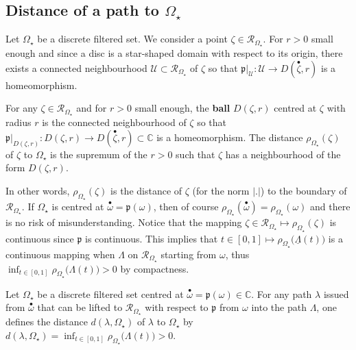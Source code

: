 \documentclass[11pt, english]{smfart}
\theoremstyle{definition}
\begin{document}
\subsection{Distance of a path to $\Omega_\star$}

Let  $\Omega_\star$ be a discrete filtered set.
We consider a point $\zeta \in
\mathscr{R}_{\Omega_\star}$. For $r>0$ small enough and 
since a disc is a star-shaped domain with
respect to its origin, there exists a connected neighbourhood  
$\mathscr{U} \subset \mathscr{R}_{\Omega_\star}$  of
$\zeta$ so that
$\mathfrak{p}|_{\mathscr{U}} : \mathscr{U} \to D({ {\stackrel{\bullet}{\zeta}} },r)$
is a homeomorphism.

\begin{defi}
For any $\zeta \in \mathscr{R}_{\Omega_\star}$ and for $r>0$ small
enough, the \textbf{ball}  $D(\zeta,r)$ centred at
$\zeta$ with radius $r$ is the connected neighbourhood of
$\zeta$ so that 
$\mathfrak{p}|_{D(\zeta,r)} : D(\zeta,r) \to D({ {\stackrel{\bullet}{\zeta}} },r) \subset \mathbb{C}$
is a homeomorphism. 
The distance $\rho_{\Omega_\star}(\zeta)$ of $\zeta$ to $\Omega_\star$
is  the supremum of the $r>0$
such that $\zeta$ has a neighbourhood of the form $D(\zeta,r)$. 
\end{defi}

In other words, $\rho_{\Omega_\star}(\zeta)$ is the distance of
$\zeta$ (for the norm $|.|$) to the boundary of $\mathscr{R}_{\Omega_\star}$. 
If $\Omega_\star$ is centred at ${ {\stackrel{\bullet}{\omega}} } = \mathfrak{p}(\omega)$,
then of course $\rho_{\Omega_\star}({ {\stackrel{\bullet}{\omega}} }) =
\rho_{\Omega_\star}(\omega)$ and there is no risk of
misunderstanding. Notice that the mapping $\zeta \in
\mathscr{R}_{\Omega_\star} \mapsto \rho_{\Omega_\star}(\zeta)$ is
continuous since $\mathfrak{p}$ is continuous. This implies that 
$t \in [0,1] \mapsto
\rho_{\Omega_\star}\big(\underline{\Lambda}(t)\big)$ is a continuous
mapping when $\Lambda$ on
$\mathscr{R}_{\Omega_\star}$ starting from $\omega$, thus 
$\inf_{t \in [0,1]} \rho_{\Omega_\star}\big( \Lambda(t)\big) >0$ by compactness.

\begin{defi}\label{dpathomega}
Let  $\Omega_\star$ be a discrete filtered set centred
at ${{ {\stackrel{\bullet}{\omega}} } = \mathfrak{p}(\omega) \in \mathbb{C}}$.
For any path $\lambda$ issued from ${ {\stackrel{\bullet}{\omega}} }$ that can be lifted to 
$\mathscr{R}_{\Omega_\star}$ with respect to $\mathfrak{p}$ from
$\omega$ into the path $\Lambda$, one defines the distance $d(\lambda,
\Omega_\star)$ of $\lambda$ to  $\Omega_\star$ by
${d(\lambda, \Omega_\star) = \inf_{t \in [0,1]} \rho_{\Omega_\star}\big( \Lambda(t)\big) >0}$.
\end{defi}
\end{document}
